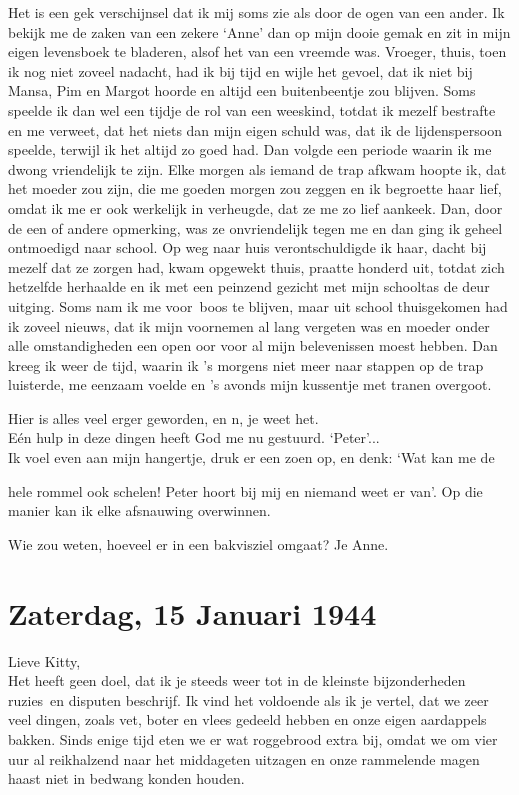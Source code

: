\documentclass{book}
\begin{document}
Het is een gek verschijnsel dat ik mij soms zie als door de ogen van een ander.
Ik bekijk me de zaken van een zekere `Anne' dan op mijn dooie gemak en zit in
mijn eigen levensboek te bladeren, alsof het van een vreemde was. Vroeger,
thuis, toen ik nog niet zoveel nadacht, had ik bij tijd en wijle het gevoel, dat
ik niet bij Mansa, Pim en Margot hoorde en altijd een buitenbeentje zou blijven.
Soms speelde ik dan wel een tijdje de rol van een weeskind, totdat ik mezelf
bestrafte en me verweet, dat het niets dan mijn eigen schuld was, dat ik de
lijdenspersoon speelde, terwijl ik het altijd zo goed had. Dan volgde een
periode waarin ik me dwong vriendelijk te zijn. Elke morgen als iemand de trap
afkwam hoopte ik, dat het moeder zou zijn, die me goeden morgen zou zeggen en ik
begroette haar lief, omdat ik me er ook werkelijk in verheugde, dat ze me zo
lief aankeek. Dan, door de een of andere opmerking, was ze onvriendelijk tegen
me en dan ging ik geheel ontmoedigd naar school. Op weg naar huis
verontschuldigde ik haar, dacht bij mezelf dat ze zorgen had, kwam opgewekt
thuis, praatte honderd uit, totdat zich hetzelfde herhaalde en ik met een
peinzend gezicht met mijn schooltas de deur uitging. Soms nam ik me voor~boos te
blijven, maar uit school thuisgekomen had ik zoveel nieuws, dat ik mijn
voornemen al lang vergeten was en moeder onder alle omstandigheden een open oor
voor al mijn belevenissen moest hebben. Dan kreeg ik weer de tijd, waarin ik 's
morgens niet meer naar stappen op de trap luisterde, me eenzaam voelde en 's
avonds mijn kussentje met tranen overgoot.

Hier is alles veel erger geworden, en n, je weet het.\\
Eén hulp in deze dingen
heeft God me nu gestuurd. `Peter'...\\
Ik voel even aan mijn hangertje, druk er
een zoen op, en denk: `Wat kan me de

hele rommel ook schelen! Peter hoort bij mij en niemand weet er van'. Op die
manier kan ik elke afsnauwing overwinnen.

Wie zou weten, hoeveel er in een bakvisziel omgaat? Je Anne.

\section*{Zaterdag, 15 Januari 1944}

Lieve Kitty,\\
Het heeft geen doel, dat ik je steeds weer tot in de kleinste
bijzonderheden ruzies~en disputen beschrijf. Ik vind het voldoende als ik je
vertel, dat we zeer veel dingen, zoals vet, boter en vlees gedeeld hebben en
onze eigen aardappels bakken. Sinds enige tijd eten we er wat roggebrood extra
bij, omdat we om vier uur al reikhalzend naar het middageten uitzagen en onze
rammelende magen haast niet in bedwang konden houden.
\end{document}
